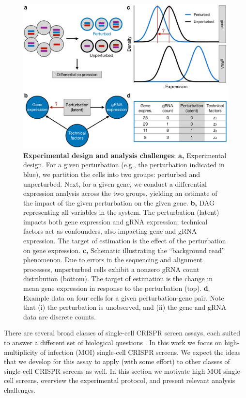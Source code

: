 \documentclass[12pt]{article}
\begin{document}
\begin{figure}
	\centering
	\includegraphics[width=1\linewidth]{../../figures/analysis_challenges/plot.pdf}
	\caption{\textbf{Experimental design and analysis challenges}: \textbf{a,} Experimental design. For a given perturbation (e.g., the perturbation indicated in blue), we partition the cells into two groups: perturbed and unperturbed. Next, for a given gene, we conduct a differential expression analysis across the two groups, yielding an estimate of the impact of the given perturbation on the given gene. \textbf{b,} DAG representing all variables in the system. The perturbation (latent) impacts both gene expression and gRNA expression; technical factors act as confounders, also impacting gene and gRNA expression. The target of estimation is the effect of the perturbation on gene expression. \textbf{c,} Schematic illustrating the ``background read'' phenomenon. Due to errors in the sequencing and alignment processes, unperturbed cells exhibit a nonzero gRNA count distribution (bottom). The target of estimation is the change in mean gene expression in response to the perturbation (top). \textbf{d}, Example data on four cells for a given perturbation-gene pair. Note that (i) the perturbation is unobserved, and (ii) the gene and gRNA data are discrete counts.}
	\label{analysis_challenges}
\end{figure}

There are several broad classes of single-cell CRISPR screen assays, each suited to answer a different set of biological questions \cite{Gasperini2019,Datlinger2021,Mimitou2019}. In this work we focus on high-multiplicity of infection (MOI) single-cell CRISPR screens. We expect the ideas that we develop for this assay to apply (with some effort) to other classes of single-cell CRISPR screens as well. In this section we motivate high MOI single-cell screens, overview the experimental protocol, and present relevant analysis challenges.
\end{document}

